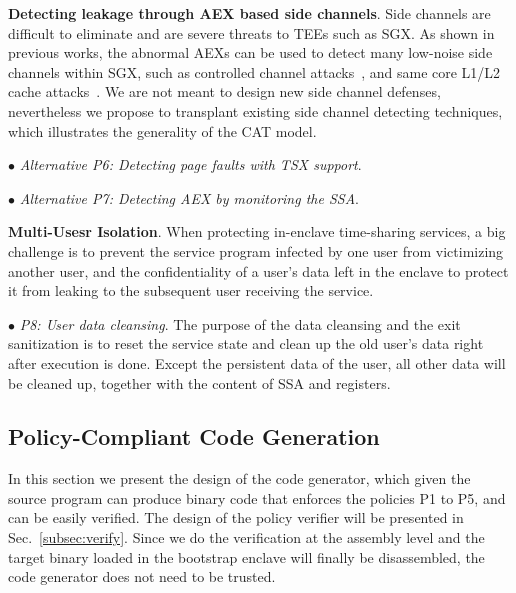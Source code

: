 {\vspace{3pt}\noindent\textbf{Detecting leakage through AEX based side channels}. Side channels are difficult to eliminate and are severe threats to TEEs such as SGX. As shown in previous works, the abnormal AEXs can be used to detect many low-noise side channels within SGX, such as controlled channel attacks~\cite{xu2015controlled}, and same core L1/L2 cache attacks~\cite{chen2018racing}. We are not meant to design new side channel defenses, nevertheless we propose to transplant 
existing side channel detecting techniques, 
which illustrates the generality of the CAT model. 


\vspace{2pt}\noindent$\bullet$\textit{ Alternative P6: Detecting page faults with TSX support}. 

\vspace{2pt}\noindent$\bullet$\textit{ Alternative P7: Detecting AEX by monitoring the SSA}.

\vspace{3pt}\noindent\textbf{Multi-Usesr Isolation}. When protecting in-enclave time-sharing services, a big challenge is to prevent the service program infected by one user from victimizing another user, and the confidentiality of a user’s data left in the enclave to protect it from leaking to the subsequent user receiving the service.

\vspace{2pt}\noindent$\bullet$\textit{ P8: User data cleansing}. The purpose of the data cleansing and the exit sanitization is to reset the service state and clean up the old user’s data right after execution is done. Except the persistent data of the user, all other data will be cleaned up, together with the content of SSA and registers.

\subsection{Policy-Compliant Code Generation}
\label{subsec-producer}
In this section we present the design of the code generator, which given the source program can produce binary code that enforces the policies P1 to P5, and can be easily verified. The design of the policy verifier will be presented in Sec.~\ref{subsec:verify}. Since we do the verification at the assembly level and the target binary loaded in the bootstrap enclave will finally be disassembled, the code generator does not need to be trusted.

}
